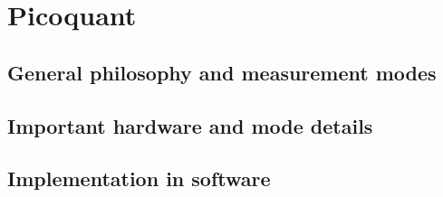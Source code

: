 \section{Picoquant}

\subsection{General philosophy and measurement modes}

\subsection{Important hardware and mode details}

\subsection{Implementation in software}